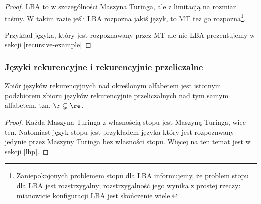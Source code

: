 \begin{proof}
	LBA to w szczególności Maszyna Turinga, ale z limitacją na rozmiar taśmy. W takim razie jeśli LBA rozpozna jakiś język, to MT też go rozpozna\footnote{Zaniepokojonych problemem stopu dla LBA informujemy, że problem stopu dla LBA jest rozstrzygalny; rozstrzygalność jego wynika z prostej rzeczy: mianowicie konfiguracji LBA jest skończenie wiele.}.

	Przykład języka, który jest rozpoznawany przez MT ale nie LBA prezentujemy w sekcji \ref{recursive-example}
\end{proof}

\subsubsection{Języki rekurencyjne i rekurencyjnie przeliczalne}
\begin{theorem}
	Zbiór języków rekurencyjnych nad określonym alfabetem jest istotnym podzbiorem zbioru języków rekurencyjnie przeliczalnych nad tym samym alfabetem, tzn. \( \r \subsetneq \re \).
\end{theorem}

\begin{proof}
	Każda Maszyna Turinga z własnością stopu jest Maszyną Turinga, więc ten. Natomiast język stopu jest przykładem języka który jest rozpoznwany jedynie przez Maszyny Turinga bez własności stopu. Więcej na ten temat jest w sekcji \ref{lhp}.
\end{proof}
